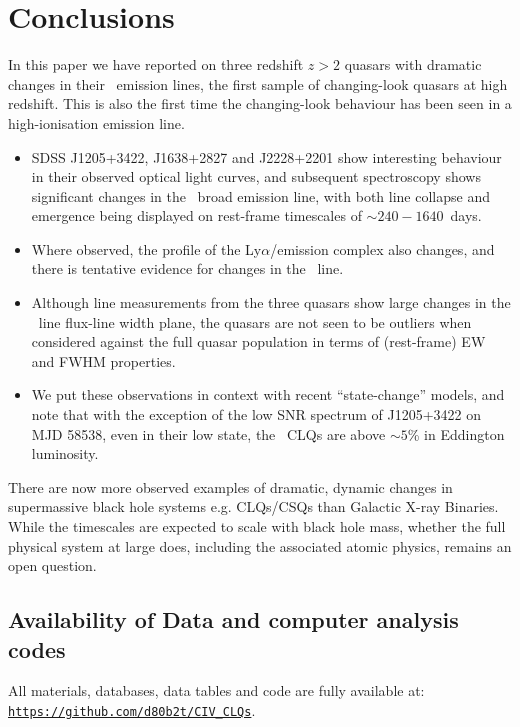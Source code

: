 \documentclass[fleqn,usenatbib]{mnras}
\begin{document}
\section{Conclusions}
In this paper we have reported on three redshift $z>2$ quasars with
dramatic changes in their \civ\ emission lines, the first sample of
changing-look quasars at high redshift.  This is also the first time
the changing-look behaviour has been seen in a high-ionisation
emission line.

\begin{itemize}
\item SDSS J1205+3422, J1638+2827 and J2228+2201 show interesting
  behaviour in their observed optical light curves, and subsequent
  spectroscopy shows significant changes in the \civ\ broad emission
  line, with both line collapse and emergence being displayed on
  rest-frame timescales of $\sim 240-1640$~days.
\item Where observed, the profile of the Ly$\alpha$/\nv emission complex
  also changes, and there is tentative evidence for changes in the \mgii\
  line.
\item Although line measurements from the three quasars show large changes
  in the \civ\ line flux-line width plane, the quasars are not seen to
  be outliers when considered against the full quasar population
  in terms of (rest-frame) EW and FWHM properties.
\item 
  We put these observations in context with recent ``state-change''
  models, and note that with the exception of the low SNR spectrum of
  J1205+3422 on MJD 58538, even in their low state, 
  the \civ\ CLQs are above $\sim5$\% in Eddington luminosity. 
\end{itemize}

There are now more observed examples of dramatic, dynamic changes in
supermassive black hole systems e.g. CLQs/CSQs than Galactic X-ray
Binaries.  While the timescales are expected to scale with black hole
mass, whether the full physical system at large does, including the
associated atomic physics, remains an open question.


\subsection*{Availability of Data and computer analysis codes} 
All materials, databases, data tables and code are fully available at: 
\href{https://github.com/d80b2t/CIV_CLQs}{\tt https://github.com/d80b2t/CIV\_CLQs}.
\end{document}
